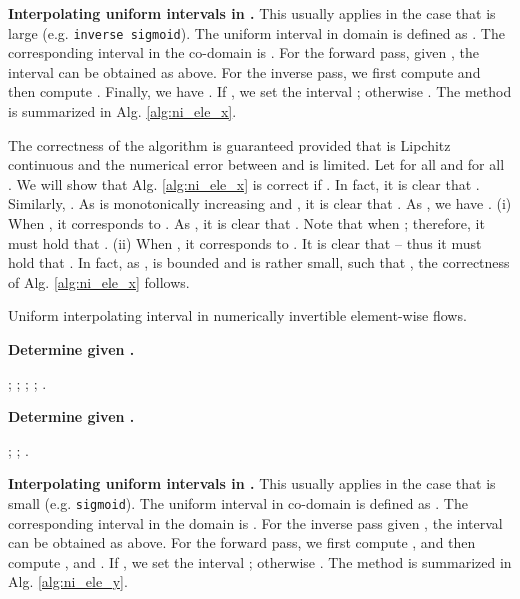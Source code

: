 \documentclass{article}
\begin{document}
\textbf{Interpolating uniform intervals in .}
This usually applies in the case that  is large (e.g. \texttt{inverse sigmoid}). The uniform interval in domain  is defined as . The corresponding interval in the co-domain is . For the forward pass, given , the interval can be obtained as above. For the inverse pass, we first compute  and then compute . Finally, we have . If , we set the interval ; otherwise . The method is summarized in Alg. \ref{alg:ni_ele_x}.

The correctness of the algorithm is guaranteed provided that  is Lipchitz continuous and the numerical error between  and  is limited. Let  for all  and  for all . We will show that Alg. \ref{alg:ni_ele_x} is correct if . In fact, it is clear that . Similarly, . As  is monotonically increasing and , it is clear that . As , we have . (i) When , it corresponds to . As , it is clear that . Note that  when ; therefore, it must hold that . (ii) When , it corresponds to . It is clear that  -- thus it must hold that . In fact, as ,  is bounded and  is rather small, such that , the correctness of Alg. \ref{alg:ni_ele_x} follows.

\begin{algorithm}[ht]
\small
\caption{Uniform interpolating interval  in numerically invertible element-wise flows.}
\begin{multicols}{2} 
\textbf{Determine  given .} 

\begin{algorithmic}[1]
\STATE ; 
\STATE ;
\STATE ;
\IF {}
\STATE ;
\ELSE
\STATE 
\ENDIF
\RETURN .
\end{algorithmic}

\vspace{8pt}
\textbf{Determine  given .} 

\begin{algorithmic}[1]
\STATE ;
\STATE ;
\RETURN .
\end{algorithmic}

\end{multicols}
\vspace{-8pt}
\label{alg:ni_ele_y}
\end{algorithm}



\textbf{Interpolating uniform intervals in .}
This usually applies in the case that  is small (e.g. \texttt{sigmoid}). The uniform interval in co-domain  is defined as . The corresponding interval in the domain is . For the inverse pass given , the interval can be obtained as above. For the forward pass, we first compute , and then compute , and . If , we set the interval ; otherwise . The method is summarized in Alg. \ref{alg:ni_ele_y}.
\end{document}

